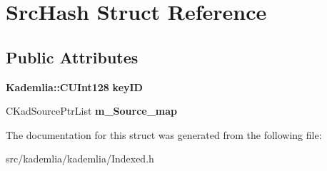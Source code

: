 \section{SrcHash Struct Reference}
\label{structSrcHash}
\subsection*{Public Attributes}
\begin{DoxyCompactItemize}
\item 
{\bf Kademlia::CUInt128} {\bfseries keyID}\label{structSrcHash_abe361deeffdc6d82c52464cc78e42b23}

\item 
CKadSourcePtrList {\bfseries m\_\-Source\_\-map}\label{structSrcHash_ab1c79bc8b8909d601cb980b675a8b23b}

\end{DoxyCompactItemize}


The documentation for this struct was generated from the following file:\begin{DoxyCompactItemize}
\item 
src/kademlia/kademlia/Indexed.h\end{DoxyCompactItemize}
